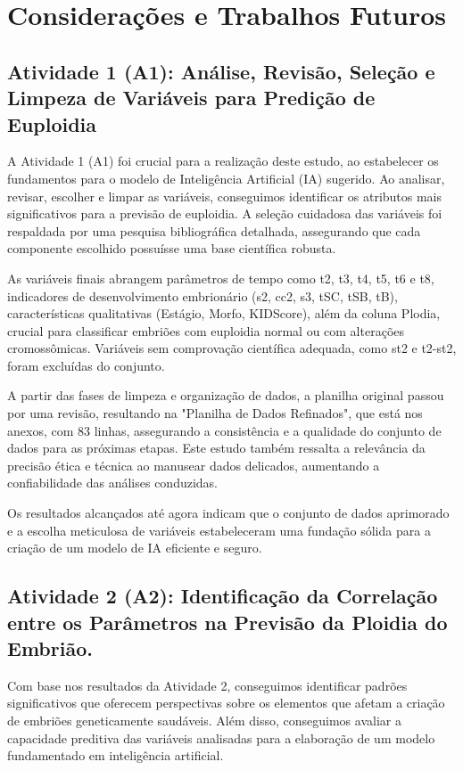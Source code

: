 \chapter[Considerações e Trabalhos Futuros]{Considerações e Trabalhos Futuros}

\section{Atividade 1 (A1): Análise, Revisão, Seleção e Limpeza de Variáveis para Predição de Euploidia}

A Atividade 1 (A1) foi crucial para a realização deste estudo, ao estabelecer os fundamentos para o modelo de Inteligência Artificial (IA) sugerido. Ao analisar, revisar, escolher e limpar as variáveis, conseguimos identificar os atributos mais significativos para a previsão de euploidia. A seleção cuidadosa das variáveis foi respaldada por uma pesquisa bibliográfica detalhada, assegurando que cada componente escolhido possuísse uma base científica robusta.

As variáveis finais abrangem parâmetros de tempo como t2, t3, t4, t5, t6 e t8, indicadores de desenvolvimento embrionário (s2, cc2, s3, tSC, tSB, tB), características qualitativas (Estágio, Morfo, KIDScore), além da coluna Plodia, crucial para classificar embriões com euploidia normal ou com alterações cromossômicas. Variáveis sem comprovação científica adequada, como st2 e t2-st2, foram excluídas do conjunto.

A partir das fases de limpeza e organização de dados, a planilha original passou por uma revisão, resultando na "Planilha de Dados Refinados", que está nos anexos, com 83 linhas, assegurando a consistência e a qualidade do conjunto de dados para as próximas etapas. Este estudo também ressalta a relevância da precisão ética e técnica ao manusear dados delicados, aumentando a confiabilidade das análises conduzidas.

Os resultados alcançados até agora indicam que o conjunto de dados aprimorado e a escolha meticulosa de variáveis estabeleceram uma fundação sólida para a criação de um modelo de IA eficiente e seguro.

\section{Atividade 2 (A2): Identificação da Correlação entre os Parâmetros na Previsão da Ploidia do Embrião.}

Com base nos resultados da Atividade 2, conseguimos identificar padrões significativos que oferecem perspectivas sobre os elementos que afetam a criação de embriões geneticamente saudáveis. Além disso, conseguimos avaliar a capacidade preditiva das variáveis analisadas para a elaboração de um modelo fundamentado em inteligência artificial.

